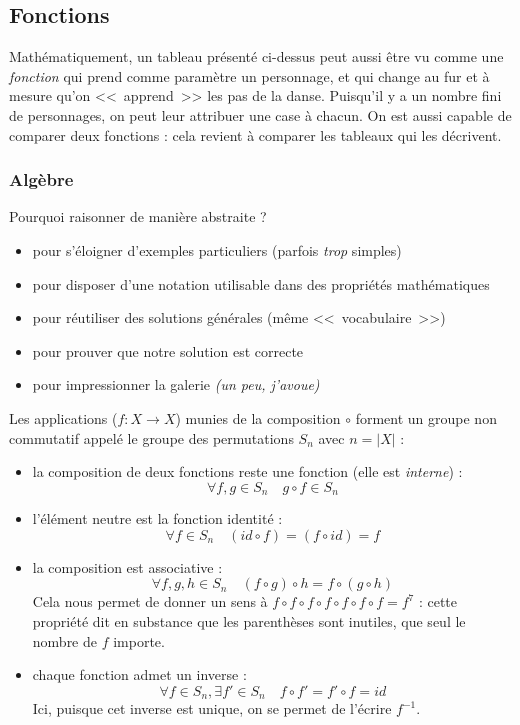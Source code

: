 \documentclass[11pt,a4paper,oneside]{book}
\begin{document}
\subsection{Fonctions}
Mathématiquement, un tableau présenté ci-dessus peut aussi être vu comme une
\emph{fonction} qui prend comme paramètre un personnage, et qui change au fur et
à mesure qu'on <<~apprend~>> les pas de la danse.
Puisqu'il y a un nombre fini de personnages, on peut leur attribuer une case à
chacun. On est aussi capable de comparer deux fonctions : cela revient à
comparer les tableaux qui les décrivent.

\subsubsection{Algèbre}
Pourquoi raisonner de manière abstraite ?
\begin{itemize}
\item pour s'éloigner d'exemples particuliers (parfois \emph{trop} simples)
\item pour disposer d'une notation utilisable dans des propriétés mathématiques
\item pour réutiliser des solutions générales (même <<~vocabulaire~>>)
\item pour prouver que notre solution est correcte
\item pour impressionner la galerie \emph{(un peu, j'avoue)}
\end{itemize}

Les applications ($f:X\rightarrow X$) munies de la composition $\circ$ forment un
groupe non commutatif appelé le groupe des permutations $S_n$ avec $n=|X|$ :
\begin{itemize}
\item la composition de deux fonctions reste une fonction
	(elle est \emph{interne}) :
	\[\forall f,g \in S_n \quad g \circ f \in S_n\]
\item l'élément neutre est la fonction identité :
	\[\forall f\in S_n \quad (id\circ f) = (f\circ id) = f\]
\item la composition est associative :
	\[\forall f, g, h \in S_n \quad (f\circ g)\circ h = f\circ (g\circ h)\]
	Cela nous permet de donner un sens à
	$f\circ f\circ f \circ f\circ f\circ f\circ f=f^7$ : cette propriété
	dit en substance que les parenthèses sont inutiles, que seul le nombre de
	$f$ importe.
\item chaque fonction admet un inverse :
	\[\forall f\in S_n, \exists f'\in S_n \quad f\circ f'=f'\circ f=id\]
	Ici, puisque cet inverse est unique, on se permet de l'écrire $f^{-1}$.
\end{itemize}
\end{document}
